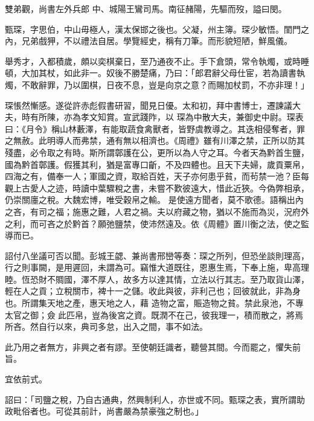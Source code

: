 \begin{pinyinscope}
 雙弟觀，尚書左外兵郎
 中、城陽王鸞司馬。南征赭陽，先驅而歿，謚曰閔。



 甄琛，字思伯，中山毋極人，漢太保邯之後也。父凝，州主簿。琛少敏悟。閨門之內，兄弟戲狎，不以禮法自居。學覽經史，稱有刀筆。而形貌短陋，鮮風儀。



 舉秀才，入都積歲，頗以奕棋棄日，至乃通夜不止。手下倉頭，常令執燭，或時睡頓，大加其杖，如此非一。奴後不勝楚痛，乃曰：「郎君辭父母仕宦，若為讀書執燭，不敢辭罪，乃以圍棋，日夜不息，豈是向京之意？而賜加杖罰，不亦非理！」



 琛悵然慚感。遂從許赤彪假書研習，聞見日優。太和初，拜中書博士，遷諫議大夫，時有所陳，亦為孝文知賞。宣武踐阼，以
 琛為中散大夫，兼御史中尉。琛表曰：《月令》稱山林藪澤，有能取蔬食禽獸者，皆野虞教導之。其迭相侵奪者，罪之無赦。此明導人而弗禁，通有無以相濟也。《周禮》雖有川澤之禁，正所以防其殘盡，必令取之有時。斯所謂鄣護在公，更所以為人守之耳。今者天為黔首生鹽，國為黔首鄣護。假獲其利，猶是富專口齗，不及四體也。且天下夫婦，歲貢粟帛，四海之有，備奉一人；軍國之資，取給百姓，天子亦何患乎貧，而茍禁一池？臣每觀上古愛人之迹，時讀中葉驟稅之書，未嘗不歎彼遠大，惜此近狹。今偽弊相承，仍崇關廛之稅。大魏宏博，唯受穀帛之輸。
 是使遠方聞者，莫不歌德。語稱出內之吝，有司之福；施惠之難，人君之禍。夫以府藏之物，猶以不施而為災，況府外之利，而可吝之於黔首？願弛鹽禁，使沛然遠及。依《周體》置川衡之法，使之監導而已。



 詔付八坐議可否以聞。彭城王勰、兼尚書邢巒等奏：琛之所列，但恐坐談則理高，行之則事闕，是用遲回，未謂為可。竊惟大道既往，恩惠生焉，下奉上施，卑高理睦。恆恐財不賙國，澤不厚人，故多方以達其情，立法以行其志。至乃取貨山澤，輕在人之貢；立稅關市，裨十一之儲。收此與彼，非利己也；回彼就此，非為身也。所謂集天地之產，惠天地之人，藉
 造物之富，賑造物之貧。禁此泉池，不專太官之御；僉此匹帛，豈為後宮之資。既潤不在己，彼我理一，積而散之，將焉所吝。然自行以來，典司多怠，出入之間，事不如法。



 此乃用之者無方，非興之者有謬。至使朝廷識者，聽營其間。今而罷之，懼失前旨。



 宜依前式。



 詔曰：「司鹽之稅，乃自古通典，然興制利人，亦世或不同。甄琛之表，實所謂助政毗俗者也。可從其前計，尚書嚴為禁豪強之制也。」




\end{pinyinscope}
